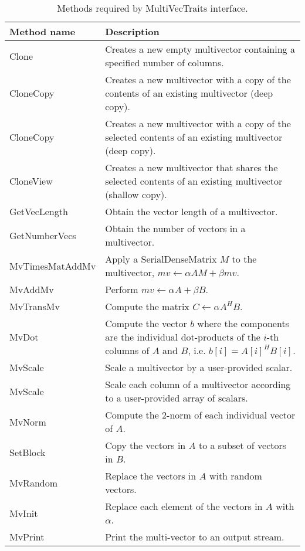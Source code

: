 \begin{table}
\begin{center}
\begin{tabular}{| p{4cm} || p{8cm} |}
\hline
Method name & Description \\
\hline\hline
Clone           & Creates a new empty multivector containing a specified number of columns.  \\\hline
CloneCopy       & Creates a new multivector with a copy of the contents of an existing multivector (deep copy). \\\hline
CloneCopy       & Creates a new multivector with a copy of the selected contents of an existing multivector (deep copy).  \\\hline
CloneView       & Creates a new multivector that shares the selected contents of an existing multivector (shallow copy).  \\\hline
GetVecLength    & Obtain the vector length of a multivector.  \\\hline
GetNumberVecs   & Obtain the number of vectors in a multivector.  \\\hline
MvTimesMatAddMv & Apply a SerialDenseMatrix $M$ to the multivector, $mv \leftarrow \alpha A M + \beta mv$.  \\\hline
MvAddMv         & Perform $mv \leftarrow \alpha A + \beta B$.  \\\hline
MvTransMv       & Compute the matrix $C \leftarrow \alpha A^H B$.  \\\hline
MvDot           & Compute the vector $b$ where the components are the individual dot-products of the $i$-th columns of $A$ and $B$, i.e. $b[i] = A[i]^H B[i]$.  \\\hline
MvScale         & Scale a multivector by a user-provided scalar. \\\hline
MvScale         & Scale each column of a multivector according to a user-provided array of scalars. \\\hline
MvNorm          & Compute the 2-norm of each individual vector of $A$.  \\\hline
SetBlock        & Copy the vectors in $A$ to a subset of vectors in $B$. \\\hline
MvRandom        & Replace the vectors in $A$ with random vectors.  \\\hline
MvInit          & Replace each element of the vectors in $A$ with $\alpha$.  \\\hline
MvPrint         & Print the multi-vector to an output stream.  \\\hline
\hline
\end{tabular}
\caption{Methods required by MultiVecTraits interface.}
\label{tab:anasazi:mvt}
\end{center}
\end{table}

